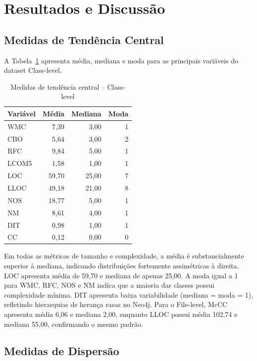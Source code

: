 \documentclass[conference]{IEEEtran}
\begin{document}
\section{Resultados e Discussão}\label{sec:resultados}

\subsection{Medidas de Tendência Central}

A Tabela~\ref{tab:tendencia_class} apresenta média, mediana e moda para as principais variáveis do dataset Class-level.

\begin{table}[htbp]
\caption{Medidas de tendência central -- Class-level}
\label{tab:tendencia_class}
\centering
\footnotesize
\begin{tabular}{lrrr}
\toprule
\textbf{Variável} & \textbf{Média} & \textbf{Mediana} & \textbf{Moda} \\
\midrule
WMC   &  7,39  &  3,00  &  1 \\
CBO   &  5,64  &  3,00  &  2 \\
RFC   &  9,84  &  5,00  &  1 \\
LCOM5 &  1,58  &  1,00  &  1 \\
LOC   & 59,70  & 25,00  &  7 \\
LLOC  & 49,18  & 21,00  &  8 \\
NOS   & 18,77  &  5,00  &  1 \\
NM    &  8,61  &  4,00  &  1 \\
DIT   &  0,98  &  1,00  &  1 \\
CC    &  0,12  &  0,00  &  0 \\
\bottomrule
\end{tabular}
\end{table}

Em todas as métricas de tamanho e complexidade, a média é substancialmente superior à mediana, indicando distribuições fortemente assimétricas à direita. LOC apresenta média de 59,70 e mediana de apenas 25,00. A moda igual a 1 para WMC, RFC, NOS e NM indica que a maioria das classes possui complexidade mínima. DIT apresenta baixa variabilidade (mediana = moda = 1), refletindo hierarquias de herança rasas no Neo4j. Para o File-level, McCC apresenta média 6,06 e mediana 2,00, enquanto LLOC possui média 102,74 e mediana 55,00, confirmando o mesmo padrão.

\subsection{Medidas de Dispersão}
\end{document}
